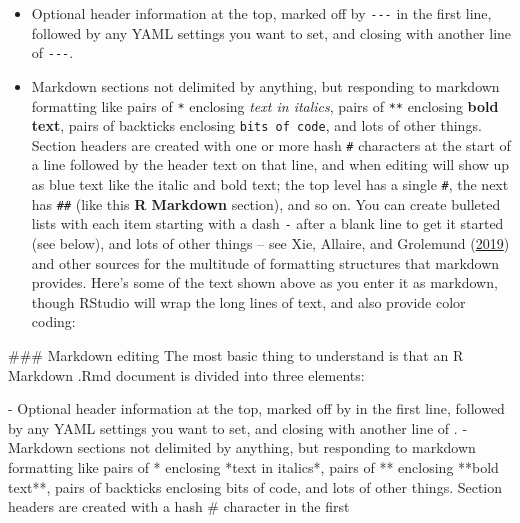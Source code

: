 \documentclass[
]{book}
\newenvironment{Shaded}{\begin{snugshade}}{\end{snugshade}}
\newcommand{\NormalTok}[1]{#1}
\providecommand{\tightlist}{%
  \setlength{\itemsep}{0pt}\setlength{\parskip}{0pt}}
\begin{document}
\begin{itemize}
\tightlist
\item
  Optional header information at the top, marked off by \texttt{-\/-\/-} in the first line, followed by any YAML settings you want to set, and closing with another line of \texttt{-\/-\/-}.
\item
  Markdown sections not delimited by anything, but responding to markdown formatting like pairs of \texttt{*} enclosing \emph{text in italics}, pairs of \texttt{**} enclosing \textbf{bold text}, pairs of backticks enclosing \texttt{bits\ of\ code}, and lots of other things. Section headers are created with one or more hash \texttt{\#} characters at the start of a line followed by the header text on that line, and when editing will show up as blue text like the italic and bold text; the top level has a single \texttt{\#}, the next has \texttt{\#\#} (like this \textbf{R Markdown} section), and so on. You can create bulleted lists with each item starting with a dash \texttt{-} after a blank line to get it started (see below), and lots of other things -- see Xie, Allaire, and Grolemund (\protect\hyperlink{ref-RMarkdown}{2019}) and other sources for the multitude of formatting structures that markdown provides. Here's some of the text shown above as you enter it as markdown, though RStudio will wrap the long lines of text, and also provide color coding:
\end{itemize}

\begin{Shaded}
\begin{Highlighting}[]
\NormalTok{\#\#\# Markdown editing}
\NormalTok{The most basic thing to understand is that an R Markdown \textasciigrave{}.Rmd\textasciigrave{} document is divided into three elements:}

\NormalTok{{-} Optional header information at the top, marked off by \textasciigrave{}{-}{-}{-}\textasciigrave{} in the first line, followed by any YAML settings you want to set, and closing with another line of \textasciigrave{}{-}{-}{-}\textasciigrave{}.}
\NormalTok{{-} Markdown sections not delimited by anything, but responding to markdown formatting like pairs of \textasciigrave{}*\textasciigrave{} enclosing *text in italics*, pairs of \textasciigrave{}**\textasciigrave{} enclosing **bold text**, pairs of backticks enclosing \textasciigrave{}bits of code\textasciigrave{}, and lots of other things. Section headers are created with a hash \textasciigrave{}\#\textasciigrave{} character in the first}
\end{Highlighting}
\end{Shaded}
\end{document}
